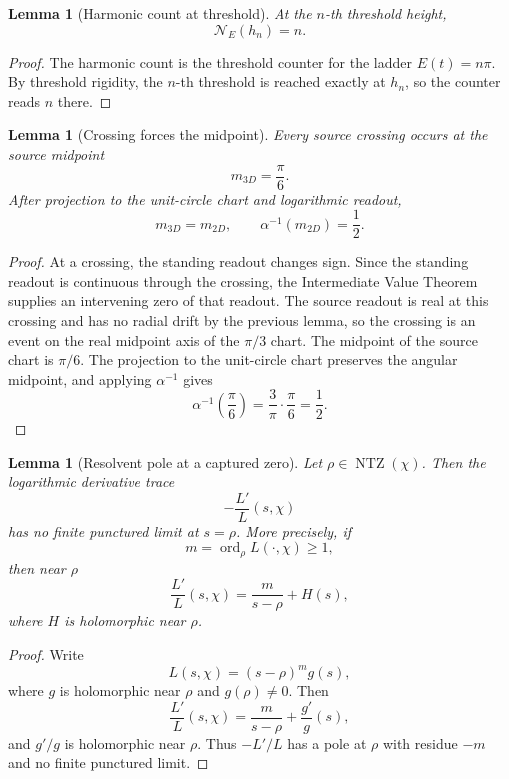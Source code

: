 \documentclass[11pt]{article}
\newtheorem{lemma}[definition]{Lemma}
\DeclareMathOperator{\NTZ}{NTZ}
\DeclareMathOperator{\ord}{ord}
\begin{document}
\begin{lemma}[Harmonic count at threshold]
At the $n$-th threshold height,
\[
  \mathcal N_{E}(h_n)=n.
\]
\end{lemma}

\begin{proof}
The harmonic count is the threshold counter for the ladder $E(t)=n\pi$.
By threshold rigidity, the $n$-th threshold is reached exactly at $h_n$, so the
counter reads $n$ there.
\end{proof}

\begin{lemma}[Crossing forces the midpoint]
Every source crossing occurs at the source midpoint
\[
  m_{3D}=\frac{\pi}{6}.
\]
After projection to the unit-circle chart and logarithmic readout,
\[
  m_{3D}=m_{2D},\qquad
  \alpha^{-1}(m_{2D})=\frac12 .
\]
\end{lemma}

\begin{proof}
At a crossing, the standing readout changes sign.  Since the standing readout is
continuous through the crossing, the Intermediate Value Theorem supplies an
intervening zero of that readout.  The source
readout is real at this crossing and has no radial drift by the previous lemma,
so the crossing is an event on the real midpoint axis of the $\pi/3$ chart.  The midpoint
of the source chart is $\pi/6$.  The projection to the unit-circle chart
preserves the angular midpoint, and applying $\alpha^{-1}$ gives
\[
  \alpha^{-1}\!\left(\frac{\pi}{6}\right)
  =
  \frac3\pi\cdot\frac{\pi}{6}
  =
  \frac12 .
\]
\end{proof}

\begin{lemma}[Resolvent pole at a captured zero]
Let $\rho\in\NTZ(\chi)$.  Then the logarithmic derivative trace
\[
  -\frac{L'}{L}(s,\chi)
\]
has no finite punctured limit at $s=\rho$.  More precisely, if
\[
  m=\ord_\rho L(\cdot,\chi)\ge1,
\]
then near $\rho$
\[
  \frac{L'}{L}(s,\chi)
  =
  \frac{m}{s-\rho}+H(s),
\]
where $H$ is holomorphic near $\rho$.
\end{lemma}

\begin{proof}
Write
\[
  L(s,\chi)=(s-\rho)^m g(s),
\]
where $g$ is holomorphic near $\rho$ and $g(\rho)\ne0$.  Then
\[
  \frac{L'}{L}(s,\chi)
  =
  \frac{m}{s-\rho}+\frac{g'}{g}(s),
\]
and $g'/g$ is holomorphic near $\rho$.  Thus $-L'/L$ has a pole at $\rho$ with
residue $-m$ and no finite punctured limit.
\end{proof}
\end{document}
